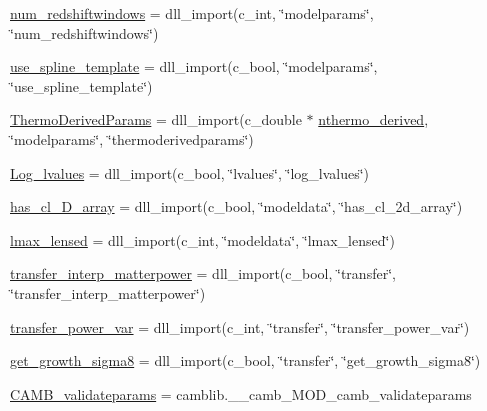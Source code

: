 \begin{DoxyCompactItemize}
\mbox{\hyperlink{namespacecamb_1_1model_a0a5db0e872ad478aca4a0554ad6792d2}{num\+\_\+redshiftwindows}} = dll\+\_\+import(c\+\_\+int, \char`\"{}modelparams\char`\"{}, \char`\"{}num\+\_\+redshiftwindows\char`\"{})
\item 
\mbox{\hyperlink{namespacecamb_1_1model_ac204c7f1ecc11e936fecf8a5e47a0fe0}{use\+\_\+spline\+\_\+template}} = dll\+\_\+import(c\+\_\+bool, \char`\"{}modelparams\char`\"{}, \char`\"{}use\+\_\+spline\+\_\+template\char`\"{})
\item 
\mbox{\hyperlink{namespacecamb_1_1model_a66626e98f39a15388d87f277404baa00}{Thermo\+Derived\+Params}} = dll\+\_\+import(c\+\_\+double $\ast$ \mbox{\hyperlink{namespacecamb_1_1model_af82d103a5c9f3263207726a866c81951}{nthermo\+\_\+derived}}, \char`\"{}modelparams\char`\"{}, \char`\"{}thermoderivedparams\char`\"{})
\item 
\mbox{\hyperlink{namespacecamb_1_1model_afba73424d28969c22260b88af9aee656}{Log\+\_\+lvalues}} = dll\+\_\+import(c\+\_\+bool, \char`\"{}lvalues\char`\"{}, \char`\"{}log\+\_\+lvalues\char`\"{})
\item 
\mbox{\hyperlink{namespacecamb_1_1model_a7580d958d18c9a8a4e9a6a3356efe4c1}{has\+\_\+cl\+\_\+D\+\_\+array}} = dll\+\_\+import(c\+\_\+bool, \char`\"{}modeldata\char`\"{}, \char`\"{}has\+\_\+cl\+\_\+2d\+\_\+array\char`\"{})
\item 
\mbox{\hyperlink{namespacecamb_1_1model_abdd1048a23db5d420d6d4bf97772ebc0}{lmax\+\_\+lensed}} = dll\+\_\+import(c\+\_\+int, \char`\"{}modeldata\char`\"{}, \char`\"{}lmax\+\_\+lensed\char`\"{})
\item 
\mbox{\hyperlink{namespacecamb_1_1model_a27f3bc0351868b7949bac8382a024694}{transfer\+\_\+interp\+\_\+matterpower}} = dll\+\_\+import(c\+\_\+bool, \char`\"{}transfer\char`\"{}, \char`\"{}transfer\+\_\+interp\+\_\+matterpower\char`\"{})
\item 
\mbox{\hyperlink{namespacecamb_1_1model_a9b8759c6644203b547f98be61118ed22}{transfer\+\_\+power\+\_\+var}} = dll\+\_\+import(c\+\_\+int, \char`\"{}transfer\char`\"{}, \char`\"{}transfer\+\_\+power\+\_\+var\char`\"{})
\item 
\mbox{\hyperlink{namespacecamb_1_1model_ae4b4e41a58f9346388273a5d22c79edc}{get\+\_\+growth\+\_\+sigma8}} = dll\+\_\+import(c\+\_\+bool, \char`\"{}transfer\char`\"{}, \char`\"{}get\+\_\+growth\+\_\+sigma8\char`\"{})
\item 
\mbox{\hyperlink{namespacecamb_1_1model_ad884bbfaffcb962dddead3d954a80879}{C\+A\+M\+B\+\_\+validateparams}} = camblib.\+\_\+\+\_\+camb\+\_\+\+M\+O\+D\+\_\+camb\+\_\+validateparams

\end{DoxyCompactItemize}
